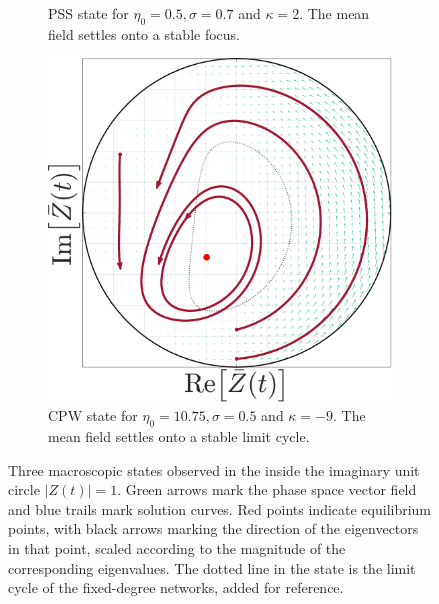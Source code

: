 \begin{figure}[H]
\begin{subfigure}[b]{0.32\linewidth}
   \caption{PSS state for $\eta_0 = 0.5, \sigma = 0.7$ and $\kappa= 2$. The mean field settles onto a stable focus.}
   \label{fig:MFOARPSS_random}
\end{subfigure} \hfill
\begin{subfigure}[b]{0.32\linewidth}
   \centering
  \includegraphics[width=\linewidth]{../Figures/PhaseSpace/MFOARCPW_scalefree.pdf}
   \caption{CPW state for $\eta_0 = 10.75, \sigma = 0.5$ and $\kappa= -9$. The mean field settles onto a stable limit cycle.}
   \label{fig:MFOARCPW_random}
\end{subfigure}
   \caption{Three macroscopic states observed in the \MFR inside the imaginary unit circle $|Z(t)| = 1$. Green arrows mark the phase space vector field and blue trails mark solution curves. Red points indicate equilibrium points, with black arrows marking the direction of the eigenvectors in that point, scaled according to the magnitude of the corresponding eigenvalues. The dotted line in the \CPW state is the limit cycle of the fixed-degree networks, added for reference.}
   \label{fig:macroscopicstatesscalefreenetworks}
\end{figure}

